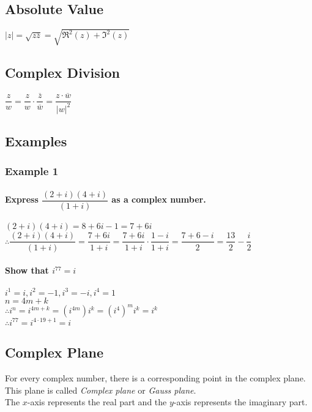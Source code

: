 \documentclass[fleqn]{article}
\begin{document}
\subsection{Absolute Value}

$\lvert z \rvert = \sqrt{z \overline{z}} = \sqrt{\Re^2(z) + \Im^2(z)}$

\subsection{Complex Division}

$\dfrac{z}{w} = \dfrac{z}{w} \cdot \dfrac{\overline{z}}{\overline{w}} = \dfrac{z \cdot \overline{w}}{\lvert w \rvert ^2}$

\subsection{Examples}

\subsubsection{Example 1}

\paragraph{Express $\dfrac{(2+i)(4+i)}{(1+i)}$ as a complex number.\\}
$(2 + i)(4 + i) = 8 + 6i -1 = 7 + 6i$\\
$\therefore \dfrac{(2+i)(4+i)}{(1+i)} = \dfrac{7 + 6i}{1 + i} = \dfrac{7 + 6i}{1 + i} \cdot \dfrac{1 - i}{1 + i} = \dfrac{7 + 6 - i}{2} = \dfrac{13}{2} - \dfrac{i}{2}$

\paragraph{Show that $i^{77} = i$\\}
$i^1 = i, i^2 = -1, i^3 = -i, i^4 = 1$\\
$n = 4m + k$\\
$\therefore i^n = i^{4m+k} = (i^{4m}) i^k = (i^4)^m i^k = i^k$\\
$\therefore i^{77} = i^{4 \cdot 19 + 1} = i$

\subsection{Complex Plane}

For every complex number, there is a corresponding point in the complex plane. This plane is called \emph{Complex plane} or \emph{Gauss plane}.\\
The $x$-axis represents the real part and the $y$-axis represents the imaginary part.\\
\end{document}
